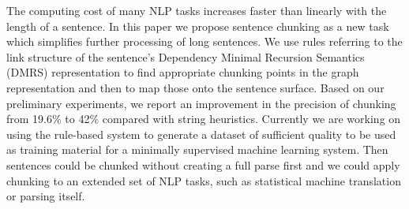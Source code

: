 The computing cost of many NLP tasks increases faster than linearly with the length of a sentence. In this paper we propose sentence chunking as a new task which simplifies further processing of long sentences. We use rules referring to the link structure of the sentence's Dependency Minimal Recursion Semantics (DMRS) representation to find appropriate chunking points in the graph representation and then to map those onto the sentence surface. Based on our preliminary experiments, we report an improvement in the precision of chunking from 19.6\% to 42\% compared with string heuristics. Currently we are working on using the rule-based system to generate a dataset of sufficient quality to be used as training material for a minimally supervised machine learning system. Then sentences could be chunked without creating a full parse first and we could apply chunking to an extended set of NLP tasks, such as statistical machine translation or parsing itself.
